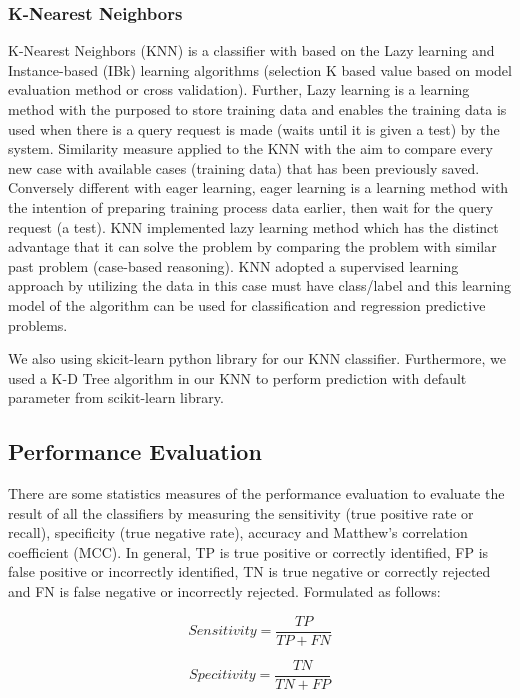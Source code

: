 \documentclass[10pt,twocolumn]{article}
\begin{document}
\subsubsection{K-Nearest Neighbors}
K-Nearest Neighbors (KNN) is a classifier with based on the Lazy learning and Instance-based (IBk) learning algorithms (selection K based value based on model evaluation method or cross validation). Further, Lazy learning is a learning method with the purposed to store training data and enables the training data is used when there is a query request is made (waits until it is given a test) by the system. Similarity measure applied to the KNN with the aim to compare every new case with available cases (training data) that has been previously saved. Conversely different with eager learning, eager learning is a learning method with the intention of preparing training process data earlier, then wait for the query request (a test). KNN implemented lazy learning method which has the distinct advantage that it can solve the problem by comparing the problem with similar past problem (case-based reasoning). KNN adopted a supervised learning approach by utilizing the data in this case must have class/label and this learning model of the algorithm can be used for classification and regression predictive problems.
\par
We also using skicit-learn python library for our KNN classifier. Furthermore, we used a K-D Tree algorithm in our KNN to perform prediction with default parameter from scikit-learn library.
\subsection{Performance Evaluation}
There are some statistics measures of the performance evaluation to evaluate the result of all the classifiers by measuring the sensitivity (true positive rate or recall), specificity (true negative rate), accuracy and Matthew's correlation coefficient (MCC). In general, TP is true positive or correctly identified, FP is false positive or incorrectly identified, TN is true negative or correctly rejected and FN is false negative or incorrectly rejected. Formulated as follows:

\begin{equation}
Sensitivity=\frac{TP}{TP+FN}
\end{equation}

\begin{equation}
Specitivity=\frac{TN}{TN+FP}
\end{equation}
\end{document}
